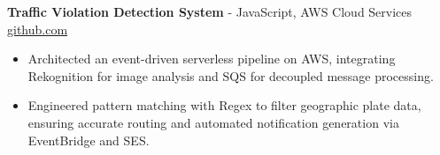 \documentclass[11pt]{article}       %
\begin{document}
\textbf{Traffic Violation Detection System}{ - JavaScript, AWS Cloud Services} \hfill \href{https://github.com/Monica20030707/AWS_rekonigition-N-read-database}{github.com} \\
\vspace{-9pt}
\begin{itemize}
  \item Architected an event-driven serverless pipeline on AWS, integrating Rekognition for image analysis and SQS for decoupled message processing.
  \item Engineered pattern matching with Regex to filter geographic plate data, ensuring accurate routing and automated notification generation via EventBridge and SES.
\end{itemize}

\end{document}
